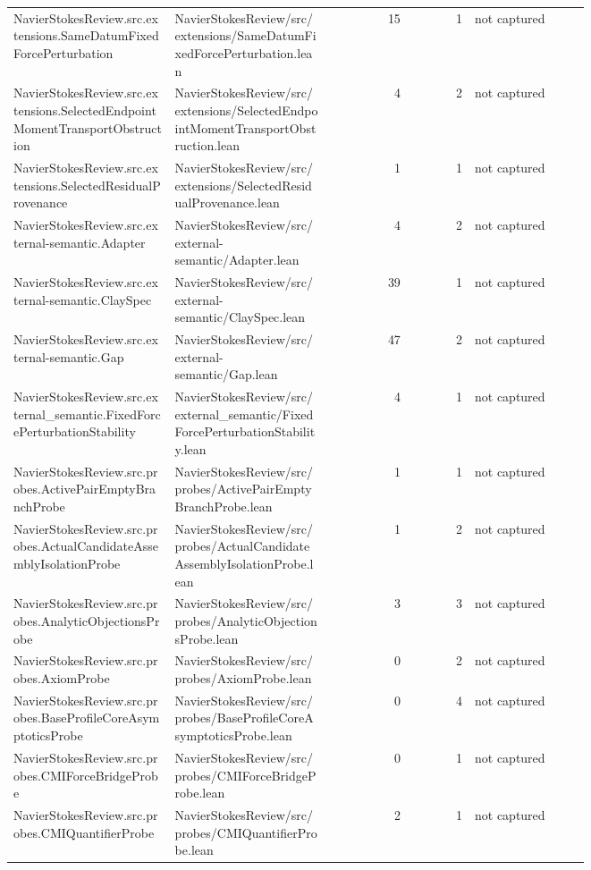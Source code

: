 \documentclass[10pt]{article}
\begin{document}
\begin{longtable}{p{0.28\linewidth}p{0.27\linewidth}r r p{0.20\linewidth}}
NavierStokesReview.src.extensions.SameDatumFixedForcePerturbation & NavierStokesReview/src/extensions/SameDatumFixedForcePerturbation.lean & 15 & 1 & not captured\\
NavierStokesReview.src.extensions.SelectedEndpointMomentTransportObstruction & NavierStokesReview/src/extensions/SelectedEndpointMomentTransportObstruction.lean & 4 & 2 & not captured\\
NavierStokesReview.src.extensions.SelectedResidualProvenance & NavierStokesReview/src/extensions/SelectedResidualProvenance.lean & 1 & 1 & not captured\\
NavierStokesReview.src.external-semantic.Adapter & NavierStokesReview/src/external-semantic/Adapter.lean & 4 & 2 & not captured\\
NavierStokesReview.src.external-semantic.ClaySpec & NavierStokesReview/src/external-semantic/ClaySpec.lean & 39 & 1 & not captured\\
NavierStokesReview.src.external-semantic.Gap & NavierStokesReview/src/external-semantic/Gap.lean & 47 & 2 & not captured\\
NavierStokesReview.src.external\_semantic.FixedForcePerturbationStability & NavierStokesReview/src/external\_semantic/FixedForcePerturbationStability.lean & 4 & 1 & not captured\\
NavierStokesReview.src.probes.ActivePairEmptyBranchProbe & NavierStokesReview/src/probes/ActivePairEmptyBranchProbe.lean & 1 & 1 & not captured\\
NavierStokesReview.src.probes.ActualCandidateAssemblyIsolationProbe & NavierStokesReview/src/probes/ActualCandidateAssemblyIsolationProbe.lean & 1 & 2 & not captured\\
NavierStokesReview.src.probes.AnalyticObjectionsProbe & NavierStokesReview/src/probes/AnalyticObjectionsProbe.lean & 3 & 3 & not captured\\
NavierStokesReview.src.probes.AxiomProbe & NavierStokesReview/src/probes/AxiomProbe.lean & 0 & 2 & not captured\\
NavierStokesReview.src.probes.BaseProfileCoreAsymptoticsProbe & NavierStokesReview/src/probes/BaseProfileCoreAsymptoticsProbe.lean & 0 & 4 & not captured\\
NavierStokesReview.src.probes.CMIForceBridgeProbe & NavierStokesReview/src/probes/CMIForceBridgeProbe.lean & 0 & 1 & not captured\\
NavierStokesReview.src.probes.CMIQuantifierProbe & NavierStokesReview/src/probes/CMIQuantifierProbe.lean & 2 & 1 & not captured\\

\end{longtable}
\end{document}
